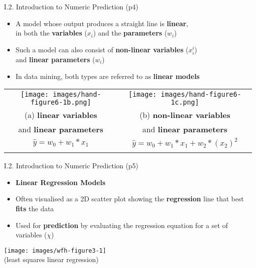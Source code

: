 \documentclass[handout]{beamer}
\newcommand{\strong}[1]{\textbf{\color{teal} #1}}
\newcommand{\stronger}[1]{\textbf{\color{purple} #1}}
\begin{document}
\begin{frame}{I.2. Introduction to Numeric Prediction (p4)}
\begin{itemize}
\item A model whose output produces a straight line is \strong{linear},\\
 in both the \strong{variables} ($x_i$) and the \strong{parameters} ($w_i$)
\item Such a model can also consist of \strong{non-linear variables} ($x_i^i$)\\
 and \strong{linear parameters} ($w_i$)
\item In data mining, both types are referred to as \stronger{linear models}
\end{itemize}
\begin{center}
{\footnotesize
\begin{tabular}{cc}
\texttt{[image: images/hand-figure6-1b.png]} &
\texttt{[image: images/hand-figure6-1c.png]} \\
(a) \strong{linear variables}  & (b) \strong{non-linear variables} \\
and \strong{linear parameters} & and \strong{linear parameters} \\
$\hat{y} = w_0 + w_1 * x_1$ & $\hat{y} = w_0 + w_1 * x_1 + w_2 * (x_2)^2$ \\
\cite[Fig 6.1b]{hand-et-al:2001} & \cite[Fig 6.1c]{hand-et-al:2001} \\
\end{tabular}
}
\end{center}
\end{frame}
\begin{frame}{I.2. Introduction to Numeric Prediction (p5)}
\begin{itemize}
\item[] \stronger{Linear Regression Models}
\item Often visualised as a 2D scatter plot showing the \stronger{regression} line that best \strong{fits} the data
\item Used for \stronger{prediction} by evaluating the regression equation for a set of variables ($\chi$)
\end{itemize}
\begin{center}
\texttt{[image: images/wfh-figure3-1]}\\
(least squares linear regression)\\
\cite[Figure 3.1]{WFH3:2011}
\end{center}
\end{frame}
\end{document}
